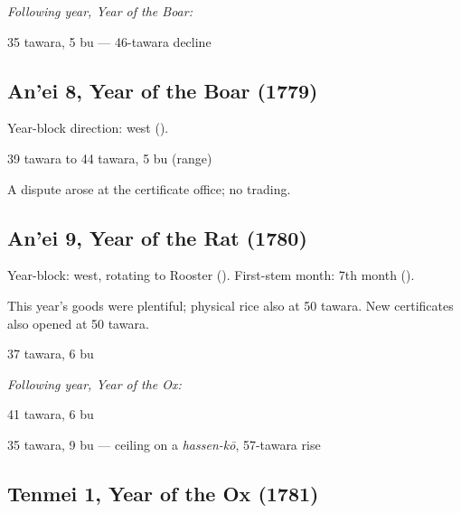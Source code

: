 \textit{Following year, Year of the Boar:}
\begin{description}[style=nextline, leftmargin=2em, font=\normalfont\bfseries]
\item[6th month] 35 tawara, 5 bu --- 46-tawara decline
\end{description}

\subsection*{An'ei 8, Year of the Boar\hfill\normalfont\small{} (1779)}

Year-block direction: west ().

\begin{description}[style=nextline, leftmargin=2em, font=\normalfont\bfseries]
\item[Opening] 39 tawara to 44 tawara, 5 bu (range)
\item[Note] A dispute arose at the certificate office; no trading.
\end{description}

\subsection*{An'ei 9, Year of the Rat\hfill\normalfont\small{} (1780)}

Year-block: west, rotating to Rooster ().
First-stem month: 7th month ().

This year's goods were plentiful; physical rice also at 50 tawara. New
certificates also opened at 50 tawara.

\begin{description}[style=nextline, leftmargin=2em, font=\normalfont\bfseries]
\item[9th month] 37 tawara, 6 bu
\end{description}

\textit{Following year, Year of the Ox:}
\begin{description}[style=nextline, leftmargin=2em, font=\normalfont\bfseries]
\item[1st month] 41 tawara, 6 bu
\item[5th month] 35 tawara, 9 bu --- ceiling on a \textit{hassen-k\=o}, 57-tawara rise
\end{description}

\subsection*{Tenmei 1, Year of the Ox\hfill\normalfont\small{} (1781)}

